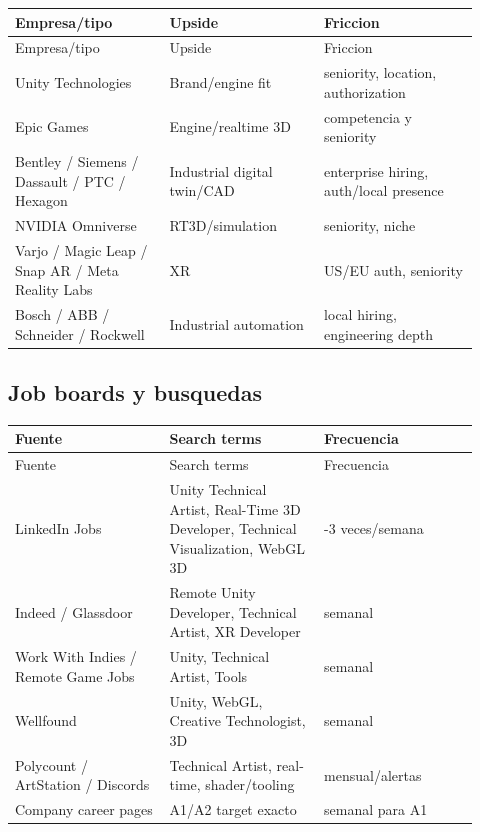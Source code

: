 \begin{center}
\scriptsize
\begin{longtable}{>{\raggedright\arraybackslash}p{0.305\linewidth} >{\raggedright\arraybackslash}p{0.305\linewidth} >{\raggedright\arraybackslash}p{0.305\linewidth}}
\toprule
Empresa/tipo & Upside & Friccion \\
\midrule
\endfirsthead
\toprule
Empresa/tipo & Upside & Friccion \\
\midrule
\endhead
Unity Technologies & Brand/engine fit & seniority, location, authorization \\
Epic Games & Engine/realtime 3D & competencia y seniority \\
Bentley / Siemens / Dassault / PTC / Hexagon & Industrial digital twin/CAD & enterprise hiring, auth/local presence \\
NVIDIA Omniverse & RT3D/simulation & seniority, niche \\
Varjo / Magic Leap / Snap AR / Meta Reality Labs & XR & US/EU auth, seniority \\
Bosch / ABB / Schneider / Rockwell & Industrial automation & local hiring, engineering depth \\
\bottomrule
\end{longtable}
\end{center}


\subsection{Job boards y busquedas}


\begin{center}
\scriptsize
\begin{longtable}{>{\raggedright\arraybackslash}p{0.305\linewidth} >{\raggedright\arraybackslash}p{0.305\linewidth} >{\raggedright\arraybackslash}p{0.305\linewidth}}
\toprule
Fuente & Search terms & Frecuencia \\
\midrule
\endfirsthead
\toprule
Fuente & Search terms & Frecuencia \\
\midrule
\endhead
LinkedIn Jobs & Unity Technical Artist, Real-Time 3D Developer, Technical Visualization, WebGL 3D & 2-3 veces/semana \\
Indeed / Glassdoor & Remote Unity Developer, Technical Artist, XR Developer & semanal \\
Work With Indies / Remote Game Jobs & Unity, Technical Artist, Tools & semanal \\
Wellfound & Unity, WebGL, Creative Technologist, 3D & semanal \\
Polycount / ArtStation / Discords & Technical Artist, real-time, shader/tooling & mensual/alertas \\
Company career pages & A1/A2 target exacto & semanal para A1 \\
\bottomrule
\end{longtable}
\end{center}


